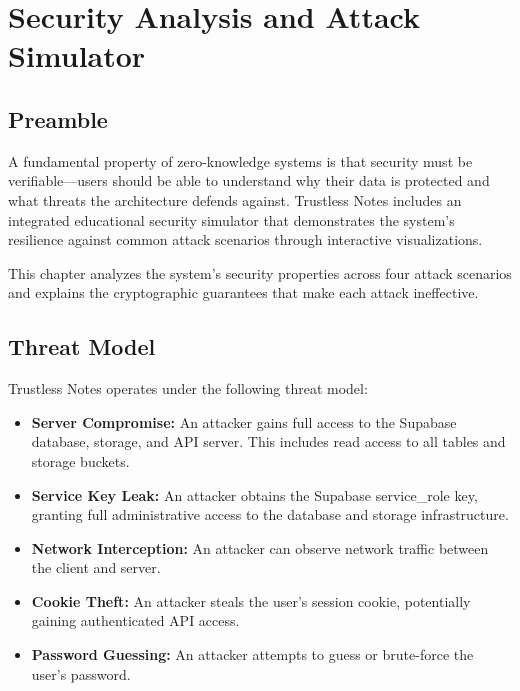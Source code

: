 
\chapter{Security Analysis and Attack Simulator}

\section{Preamble}

A fundamental property of zero-knowledge systems is that security must be verifiable---users should be able to understand why their data is protected and what threats the architecture defends against. Trustless Notes includes an integrated educational security simulator that demonstrates the system's resilience against common attack scenarios through interactive visualizations.

This chapter analyzes the system's security properties across four attack scenarios and explains the cryptographic guarantees that make each attack ineffective.

\section{Threat Model}

Trustless Notes operates under the following threat model:

\begin{itemize}
    \item \textbf{Server Compromise:} An attacker gains full access to the Supabase database, storage, and API server. This includes read access to all tables and storage buckets.

    \item \textbf{Service Key Leak:} An attacker obtains the Supabase service\_role key, granting full administrative access to the database and storage infrastructure.

    \item \textbf{Network Interception:} An attacker can observe network traffic between the client and server.

    \item \textbf{Cookie Theft:} An attacker steals the user's session cookie, potentially gaining authenticated API access.

    \item \textbf{Password Guessing:} An attacker attempts to guess or brute-force the user's password.
\end{itemize}

